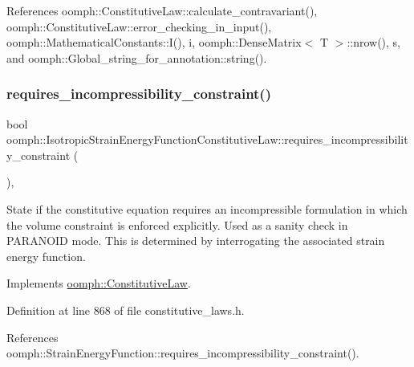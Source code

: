 References oomph\+::\+Constitutive\+Law\+::calculate\+\_\+contravariant(), oomph\+::\+Constitutive\+Law\+::error\+\_\+checking\+\_\+in\+\_\+input(), oomph\+::\+Mathematical\+Constants\+::\+I(), i, oomph\+::\+Dense\+Matrix$<$ T $>$\+::nrow(), s, and oomph\+::\+Global\+\_\+string\+\_\+for\+\_\+annotation\+::string().

\mbox{\label{classoomph_1_1IsotropicStrainEnergyFunctionConstitutiveLaw_a6b9a454988b023a42782f78e4e3eebc4}} 
\subsubsection{\texorpdfstring{requires\+\_\+incompressibility\+\_\+constraint()}{requires\_incompressibility\_constraint()}}
{\footnotesize\ttfamily bool oomph\+::\+Isotropic\+Strain\+Energy\+Function\+Constitutive\+Law\+::requires\+\_\+incompressibility\+\_\+constraint (\begin{DoxyParamCaption}{ }\end{DoxyParamCaption})\hspace{0.3cm}{\ttfamily [inline]}, {\ttfamily [virtual]}}



State if the constitutive equation requires an incompressible formulation in which the volume constraint is enforced explicitly. Used as a sanity check in P\+A\+R\+A\+N\+O\+ID mode. This is determined by interrogating the associated strain energy function. 



Implements \hyperlink{classoomph_1_1ConstitutiveLaw_a446452158a8ae9fbc3dde4277155f824}{oomph\+::\+Constitutive\+Law}.



Definition at line 868 of file constitutive\+\_\+laws.\+h.



References oomph\+::\+Strain\+Energy\+Function\+::requires\+\_\+incompressibility\+\_\+constraint().



